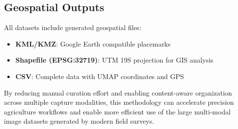 \subsection*{Geospatial Outputs}

All datasets include generated geospatial files:
\begin{itemize}
    \item \textbf{KML/KMZ}: Google Earth compatible placemarks
    \item \textbf{Shapefile (EPSG:32719)}: UTM 19S projection for GIS analysis
    \item \textbf{CSV}: Complete data with UMAP coordinates and GPS
\end{itemize}

By reducing manual curation effort and enabling content-aware organization across multiple capture modalities, this methodology can accelerate precision agriculture workflows and enable more efficient use of the large multi-modal image datasets generated by modern field surveys.
